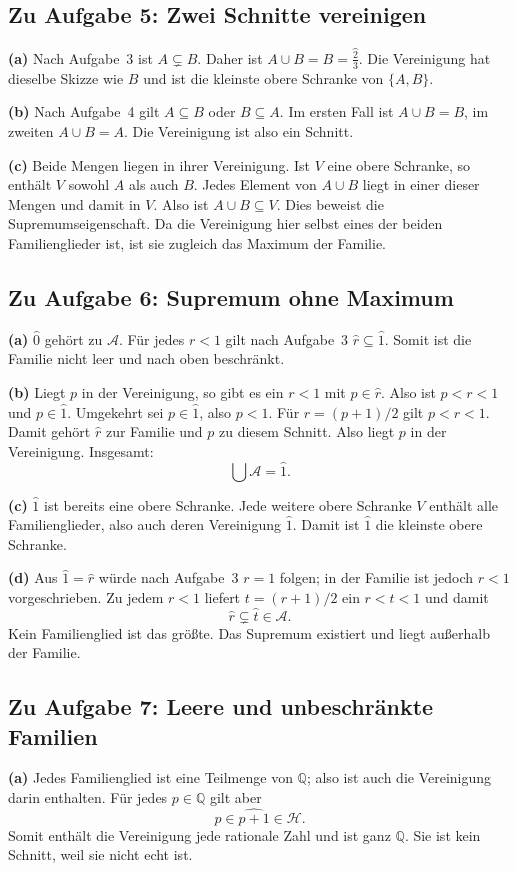 \clearpage
\subsection*{Zu Aufgabe 5: Zwei Schnitte vereinigen}
\textbf{(a)} Nach Aufgabe~3 ist $A\subsetneq B$.
Daher ist $A\cup B=B=\widehat{\frac23}$.
Die Vereinigung hat dieselbe Skizze wie $B$ und ist
die kleinste obere Schranke von $\{A,B\}$.

\textbf{(b)} Nach Aufgabe~4 gilt $A\subseteq B$ oder
$B\subseteq A$. Im ersten Fall ist $A\cup B=B$,
im zweiten $A\cup B=A$. Die Vereinigung ist also ein Schnitt.

\textbf{(c)} Beide Mengen liegen in ihrer Vereinigung.
Ist $V$ eine obere Schranke, so enthält $V$ sowohl $A$ als auch $B$.
Jedes Element von $A\cup B$ liegt in einer dieser Mengen und damit
in $V$. Also ist $A\cup B\subseteq V$.
Dies beweist die Supremumseigenschaft.
Da die Vereinigung hier selbst eines der beiden Familienglieder
ist, ist sie zugleich das Maximum der Familie.

\subsection*{Zu Aufgabe 6: Supremum ohne Maximum}
\textbf{(a)} $\widehat0$ gehört zu $\mathcal A$.
Für jedes $r<1$ gilt nach Aufgabe~3
$\widehat r\subseteq\widehat1$.
Somit ist die Familie nicht leer und nach oben beschränkt.

\textbf{(b)} Liegt $p$ in der Vereinigung, so gibt es ein
$r<1$ mit $p\in\widehat r$. Also ist $p<r<1$ und
$p\in\widehat1$.
Umgekehrt sei $p\in\widehat1$, also $p<1$.
Für $r=(p+1)/2$ gilt $p<r<1$.
Damit gehört $\widehat r$ zur Familie und $p$ zu diesem Schnitt.
Also liegt $p$ in der Vereinigung. Insgesamt:
\[
 \bigcup\mathcal A=\widehat1.
\]

\textbf{(c)} $\widehat1$ ist bereits eine obere Schranke.
Jede weitere obere Schranke $V$ enthält alle Familienglieder,
also auch deren Vereinigung $\widehat1$.
Damit ist $\widehat1$ die kleinste obere Schranke.

\textbf{(d)} Aus $\widehat1=\widehat r$ würde nach Aufgabe~3
$r=1$ folgen; in der Familie ist jedoch $r<1$ vorgeschrieben.
Zu jedem $r<1$ liefert $t=(r+1)/2$ ein $r<t<1$ und damit
\[
 \widehat r\subsetneq\widehat t\in\mathcal A.
\]
Kein Familienglied ist das größte. Das Supremum existiert
und liegt außerhalb der Familie.

\clearpage
\subsection*{Zu Aufgabe 7: Leere und unbeschränkte Familien}
\textbf{(a)} Jedes Familienglied ist eine Teilmenge von $\mathbb Q$;
also ist auch die Vereinigung darin enthalten.
Für jedes $p\in\mathbb Q$ gilt aber
\[
 p\in\widehat{p+1}\in\mathcal H.
\]
Somit enthält die Vereinigung jede rationale Zahl und ist ganz
$\mathbb Q$. Sie ist kein Schnitt, weil sie nicht echt ist.

